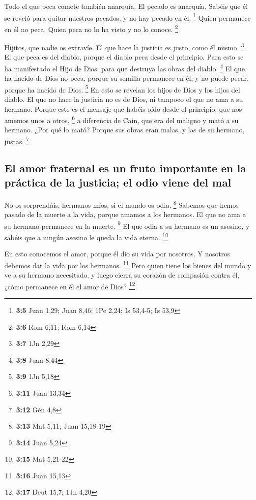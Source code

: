 \begin{paracol}{2}
 Todo el que peca comete también anarquía. El pecado es
anarquía.  Sabéis que él se reveló para quitar nuestros
pecados, y no hay pecado en él. \footnote{\textbf{3:5} Juan 1,29; Juan
  8,46; 1Pe 2,24; Is 53,4-5; Is 53,9}  Quien permanece en
él no peca. Quien peca no lo ha visto y no lo conoce. \footnote{\textbf{3:6}
  Rom 6,11; Rom 6,14}

 Hijitos, que nadie os extravíe. El que hace la justicia
es justo, como él mismo. \footnote{\textbf{3:7} 1Jn 2,29} 
El que peca es del diablo, porque el diablo peca desde el principio.
Para esto se ha manifestado el Hijo de Dios: para que destruya las obras
del diablo. \footnote{\textbf{3:8} Juan 8,44}  El que ha
nacido de Dios no peca, porque su semilla permanece en él, y no puede
pecar, porque ha nacido de Dios. \footnote{\textbf{3:9} 1Jn 5,18}
 En esto se revelan los hijos de Dios y los hijos del
diablo. El que no hace la justicia no es de Dios, ni tampoco el que no
ama a su hermano.  Porque este es el mensaje que habéis
oído desde el principio: que nos amemos unos a otros, \footnote{\textbf{3:11}
  Juan 13,34}  a diferencia de Caín, que era del maligno
y mató a su hermano. ¿Por qué lo mató? Porque sus obras eran malas, y
las de su hermano, justas. \footnote{\textbf{3:12} Gén 4,8}

\hypertarget{el-amor-fraternal-es-un-fruto-importante-en-la-pruxe1ctica-de-la-justicia-el-odio-viene-del-mal}{%
\subsection{El amor fraternal es un fruto importante en la práctica de
la justicia; el odio viene del
mal}\label{el-amor-fraternal-es-un-fruto-importante-en-la-pruxe1ctica-de-la-justicia-el-odio-viene-del-mal}}

 No os sorprendáis, hermanos míos, si el mundo os odia.
\footnote{\textbf{3:13} Mat 5,11; Juan 15,18-19}  Sabemos
que hemos pasado de la muerte a la vida, porque amamos a los hermanos.
El que no ama a su hermano permanece en la muerte. \footnote{\textbf{3:14}
  Juan 5,24}  El que odia a su hermano es un asesino, y
sabéis que a ningún asesino le queda la vida eterna. \footnote{\textbf{3:15}
  Mat 5,21-22}

 En esto conocemos el amor, porque él dio su vida por
nosotros. Y nosotros debemos dar la vida por los hermanos. \footnote{\textbf{3:16}
  Juan 15,13}  Pero quien tiene los bienes del mundo y ve
a su hermano necesitado, y luego cierra su corazón de compasión contra
él, ¿cómo permanece en él el amor de Dios? \footnote{\textbf{3:17} Deut
  15,7; 1Jn 4,20}


\end{paracol}
